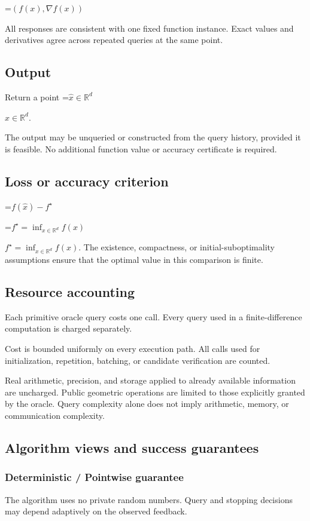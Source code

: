 \documentclass[10pt,a4paper]{article}
\newcommand{\AtlasMath}[1]{\par\begingroup\centering\setbox0=\hbox{$\displaystyle #1$}\ifdim\wd0>1.4\linewidth\typeout{ATLAS WIDE FORMULA: \the\wd0}\fi\ifdim\wd0>\linewidth\resizebox{\linewidth}{!}{\box0}\else\box0\fi\par\endgroup}
\newcommand{\AtlasInlineMath}[1]{\begingroup\setbox0=\hbox{$#1$}\ifdim\wd0>.4\linewidth\endgroup\AtlasMath{#1}\else\endgroup$#1$\fi}
\begin{document}
\AtlasMath{(f(x),\nabla f(x))}


All responses are consistent with one fixed function instance. Exact values and derivatives agree across repeated queries at the same point.

\subsection{Output}
Return a point \AtlasInlineMath{\widehat x\in\mathbb R^d}.

The output may be unqueried or constructed from the query history, provided it is feasible. No additional function value or accuracy certificate is required.

\subsection{Loss or accuracy criterion}

\AtlasMath{f(\widehat{x})-f^\star}


\AtlasInlineMath{f^\star=\inf_{x\in \mathbb{R}^d}f(x)}. The existence, compactness, or initial-suboptimality assumptions ensure that the optimal value in this comparison is finite.

\subsection{Resource accounting}
Each primitive oracle query costs one call. Every query used in a finite-difference computation is charged separately.

Cost is bounded uniformly on every execution path. All calls used for initialization, repetition, batching, or candidate verification are counted.

Real arithmetic, precision, and storage applied to already available information are uncharged. Public geometric operations are limited to those explicitly granted by the oracle. Query complexity alone does not imply arithmetic, memory, or communication complexity.

\subsection{Algorithm views and success guarantees}
\subsubsection{Deterministic / Pointwise guarantee}
The algorithm uses no private random numbers. Query and stopping decisions may depend adaptively on the observed feedback.
\end{document}
